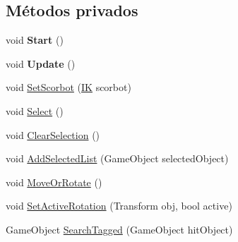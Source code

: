 \subsection*{Métodos privados}
\begin{DoxyCompactItemize}
\item 
\mbox{\label{class_selection_control_a3561fe9fd9a6a8d2c6e4a2f389b6d2dd}} 
void {\bfseries Start} ()
\item 
\mbox{\label{class_selection_control_ad79a2cfc74608733edcd1be0164cc491}} 
void {\bfseries Update} ()
\item 
void \mbox{\hyperlink{class_selection_control_a8b366f1e8d48984ff2914bb74726466e}{Set\+Scorbot}} (\mbox{\hyperlink{class_i_k}{IK}} scorbot)
\item 
void \mbox{\hyperlink{class_selection_control_a6e08e34b6c7bfe54260faeaa29b369c0}{Select}} ()
\item 
void \mbox{\hyperlink{class_selection_control_a41c82620db4b415375d6579c5a0aa17b}{Clear\+Selection}} ()
\item 
void \mbox{\hyperlink{class_selection_control_ae0e2d8a1673fab1de51bee6e15d3f872}{Add\+Selected\+List}} (Game\+Object selected\+Object)
\item 
void \mbox{\hyperlink{class_selection_control_a9684b6a02a6e31a00c6a87b5e9d29f62}{Move\+Or\+Rotate}} ()
\item 
void \mbox{\hyperlink{class_selection_control_a124591d0f0eac9b99cd9a7cc4f9839c7}{Set\+Active\+Rotation}} (Transform obj, bool active)
\item 
Game\+Object \mbox{\hyperlink{class_selection_control_af43fca6b87eee0f60bc8bb79f987d42c}{Search\+Tagged}} (Game\+Object hit\+Object)
\end{DoxyCompactItemize}

